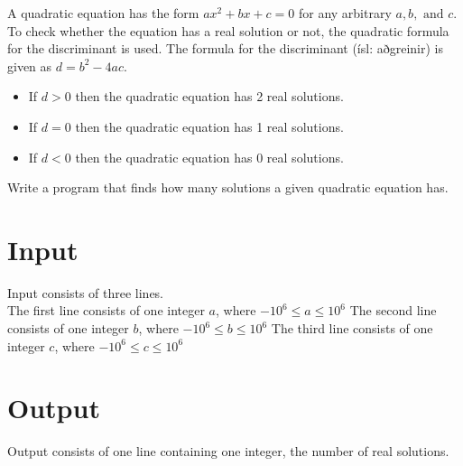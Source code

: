 
A quadratic equation has the form $ax^2 + bx + c = 0$ for any arbitrary $a, b, \text{ and } c$. To check whether the equation has a real solution or not, the quadratic formula for the discriminant is used. The formula for the discriminant (ísl: aðgreinir) is given as $d = b^2 - 4ac$.
\begin{itemize}
	\item If $d > 0$ then the quadratic equation has 2 real solutions.
	\item If $d = 0$ then the quadratic equation has 1 real solutions.
	\item If $d < 0$ then the quadratic equation has 0 real solutions.
\end{itemize}

Write a program that finds how many solutions a given quadratic equation has.

\section*{Input}
Input consists of three lines. \\
The first line consists of one integer $a$, where $-10^6 \leq a \leq 10^6$
The second line consists of one integer $b$, where $-10^6 \leq b \leq 10^6$
The third line consists of one integer $c$, where $-10^6 \leq c \leq 10^6$

\section*{Output}
Output consists of one line containing one integer, the number of real solutions.
